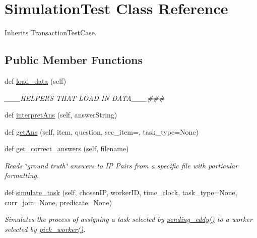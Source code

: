 \hypertarget{classdynamicfilterapp_1_1test__simulations_1_1_simulation_test}{}\section{Simulation\+Test Class Reference}
\label{classdynamicfilterapp_1_1test__simulations_1_1_simulation_test}


Inherits Transaction\+Test\+Case.

\subsection*{Public Member Functions}
\begin{DoxyCompactItemize}
\item 
def \mbox{\hyperlink{classdynamicfilterapp_1_1test__simulations_1_1_simulation_test_a3e78e589cce2f0b893a227e23c51a87b}{load\+\_\+data}} (self)
\begin{DoxyCompactList}\small\item\em \+\_\+\+\_\+\+\_\+\+H\+E\+L\+P\+E\+RS T\+H\+AT L\+O\+AD IN D\+A\+T\+A\+\_\+\+\_\+\+\_\+\#\#\# \end{DoxyCompactList}\item 
def \mbox{\hyperlink{classdynamicfilterapp_1_1test__simulations_1_1_simulation_test_a2b105c6da535dfcd9ad506bd77a5c574}{interpret\+Ans}} (self, answer\+String)
\item 
def \mbox{\hyperlink{classdynamicfilterapp_1_1test__simulations_1_1_simulation_test_ae53b544987bdb14f48c8b971b3934aea}{get\+Ans}} (self, item, question, sec\+\_\+item=\textquotesingle{}\textquotesingle{}, task\+\_\+type=\textquotesingle{}None\textquotesingle{})
\item 
def \mbox{\hyperlink{classdynamicfilterapp_1_1test__simulations_1_1_simulation_test_a395b393866987a38160e3a44d9958d92}{get\+\_\+correct\+\_\+answers}} (self, filename)
\begin{DoxyCompactList}\small\item\em Reads \char`\"{}ground truth\char`\"{} answers to IP Pairs from a specific file with particular formatting. \end{DoxyCompactList}\item 
def \mbox{\hyperlink{classdynamicfilterapp_1_1test__simulations_1_1_simulation_test_a8bed8f0f57234f8356ce3bc19606c6bf}{simulate\+\_\+task}} (self, chosen\+IP, worker\+ID, time\+\_\+clock, task\+\_\+type=None, curr\+\_\+join=None, predicate=None)
\begin{DoxyCompactList}\small\item\em Simulates the process of assigning a task selected by \mbox{\hyperlink{namespacedynamicfilterapp_1_1views__helpers_ad11bcb9737901ab723493b4f7fe09329}{pending\+\_\+eddy()}} to a worker selected by \mbox{\hyperlink{classdynamicfilterapp_1_1test__simulations_1_1_simulation_test_acb17139f8e2f7a4b835ec1c05400e8c2}{pick\+\_\+worker()}}. \end{DoxyCompactList}\item 

\end{DoxyCompactItemize}
